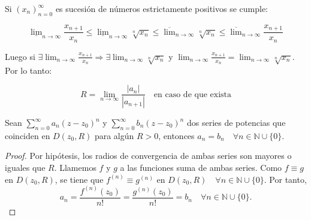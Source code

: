 \begin{proposición}
Si $(x_n)_{n=0}^{\infty}$ es sucesión de números estrictamente positivos se cumple:

\[ \underline{\lim}_{n \to \infty} \frac{x_{n+1}}{x_n} \le \underline{\lim}_{n \to \infty} \sqrt[n]{x_n} \le \overline{\lim}_{n \to \infty} \sqrt[n]{x_n} \le \overline{\lim}_{n \to \infty} \frac{x_{n+1}}{x_n} \]

Luego si $\exists \lim_{n \to \infty} \frac{x_{n+1}}{x_n} \Rightarrow \exists \lim_{n \to \infty} \sqrt[n]{x_n}$ y $\lim_{n \to \infty} \frac{x_{n+1}}{x_n} = \lim_{n \to \infty} \sqrt[n]{x_n}$. Por lo tanto:

\[ R = \lim_{n \to \infty} \frac{|a_n|}{|a_{n+1}|} \quad \text{en caso de que exista} \]
\end{proposición}

\begin{teorema} 
    Sean $\sum_{n=0}^{\infty} a_n (z - z_0)^n$ y $\sum_{n=0}^{\infty} b_n (z - z_0)^n$ dos series de potencias que coinciden en $D(z_0, R)$ para algún $R > 0$, entonces $a_n = b_n \quad \forall n \in \mathbb{N} \cup \{0\}$.
\end{teorema}

\begin{proof}
    Por hipótesis, los radios de convergencia de ambas series son mayores o iguales que $R$. Llamemos $f$ y $g$ a las funciones suma de ambas series. Como $f \equiv g$ en $D(z_0, R)$, se tiene que $f^{(n)} \equiv g^{(n)}$ en $D(z_0, R) \quad \forall n \in \mathbb{N} \cup \{0\}$. Por tanto, 
    \[
        a_n = \frac{f^{(n)}(z_0)}{n!} = \frac{g^{(n)}(z_0)}{n!} = b_n \quad \forall n \in \mathbb{N} \cup \{0\}.
    \]
\end{proof}

